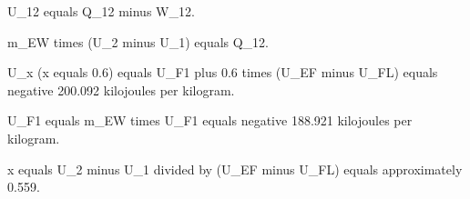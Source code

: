U_12 equals Q_12 minus W_12.  

m_EW times (U_2 minus U_1) equals Q_12.  

U_x (x equals 0.6) equals U_F1 plus 0.6 times (U_EF minus U_FL) equals negative 200.092 kilojoules per kilogram.  

U_F1 equals m_EW times U_F1 equals negative 188.921 kilojoules per kilogram.  

x equals U_2 minus U_1 divided by (U_EF minus U_FL) equals approximately 0.559.
